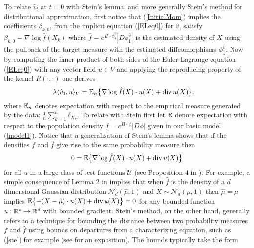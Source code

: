 \documentclass[noinfoline]{imsart}
\begin{document}
To relate $\hat v_t$ at $t=0$ with Stein's lemma, and more generally Stein's method for distributional approximation,  first notice that (\ref{InitialMom}) implies the coefficients $\beta_{k,0}$,  from the implicit equation  (\ref{ELeq0}) for  $\hat v$, satisfy
$\beta_{k,0}%
 = \nabla \log \hat f(X_k)
$ where  $\hat f= e^{ H\circ \phi^{\hat v}_1}  |D\phi_1^{\hat v}| $ is the estimated density of $X$ using the pullback of the target measure with the estimated diffeomorphisms $\phi^{\hat v}_1$.
 Now by computing the inner product of  both sides of the Euler-Lagrange equation (\ref{ELeq0}) with any vector field $u\in V$ and applying the reproducing property of the kernel $R(\cdot,\cdot)$ one derives
 \begin{align}
\lambda \langle \hat v_0, u\rangle_V%
&=\Bbb E_n\bigl\{ \nabla \log \hat f(X)\cdot  u(X) + \text{div}\, u(X)\bigr\}. \label{stein2}
\end{align}
where $\Bbb E_n$ denotes  expectation with respect to the empirical measure generated by the data: $\frac{1}{n}\sum_{k=1}^n \delta_{X_k}$.
To relate with Stein first let $\Bbb E$ denote expectation with respect to the population density $f =    e^{ H\circ \phi} |D\phi| $ given in our basic model (\ref{model1}). Notice that a generalization of Stein's lemma shows that if the densities $f$ and $\hat f$ give rise to the same probability measure then
\begin{equation}
\label{ste}
0= \Bbb E\bigl\{ \nabla \log \hat f(X) \cdot u(X) + \text{div}\, u(X)\bigr\}
 \end{equation}
for all $u$ in a large class of test functions $\mathcal U$ (see Proposition 4 in \cite{stein:04}).
For example, a simple consequence of Lemma 2 in \cite{stein:81} implies that when $\hat f$ is the density of a  $d$ dimensional Gaussian  distribution $\mathcal N_d(\hat\mu,1)$  and $X\sim \mathcal N_d(\mu,1)$ then $\hat\mu = \mu$ implies $ \Bbb E\bigl\{ -  (X-\hat\mu) \cdot u(X) + \text{div}\, u(X) \bigr\} =0$
for any bounded function $u:\Bbb R^d \rightarrow \Bbb R^d$ with bounded gradient. Stein's method, on the other hand, generally refers to  a technique for  bounding the distance between two probability measures $f$ and $\hat f$ using bounds on departures from a characterizing equation, such as  (\ref{ste}) for example (see \cite{chen:05} for an exposition). The bounds typically take the form
\end{document}
